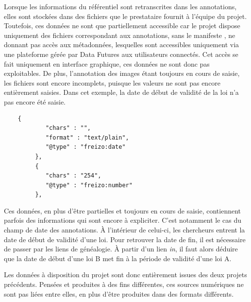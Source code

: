 Lorsque les informations du référentiel sont retranscrites dans les annotations, elles sont stockées dans des fichiers \JSON que le prestataire fournit à l'équipe du projet. Toutefois, ces données ne sont que partiellement accessible car le projet dispose uniquement des fichiers correspondant aux annotations, sans le manifeste \IIIF, ne donnant pas accès aux métadonnées, lesquelles sont accessibles uniquement via une plateforme gérée par Data Futures aux utilisateurs connectés. Cet accès se fait uniquement en interface graphique, ces données ne sont donc pas exploitables. De plus, l'annotation des images étant toujours en cours de saisie, les fichiers \JSON sont encore incomplets, puisque les valeurs ne sont pas encore entièrement saisies. Dans cet exemple, la date de début de validité de la loi n'a pas encore été saisie. 

\begin{verbatim}
    {
            "chars" : "",
            "format" : "text/plain",
            "@type" : "freizo:date"
         },
         {
            "chars" : "254",
            "@type" : "freizo:number"
         },
\end{verbatim}

Ces données, en plus d'être partielles et toujours en cours de saisie, contiennent parfois des informations qui sont encore à expliciter. C'est notamment le cas du champ de date des annotations. À l'intérieur de celui-ci, les chercheurs entrent la date de début de validité d'une loi. Pour retrouver la date de fin, il est nécessaire de passer par les liens de généalogie. À partir d'un lien \textit{in}, il faut alors déduire que la date de début d'une loi B met fin à la période de validité d'une loi A. 

Les données à disposition du projet \COREL sont donc entièrement issues des deux projets précédents. Pensées et produites à des fins différentes, ces sources numériques ne sont pas liées entre elles, en plus d'être produites dans des formats différents. 
